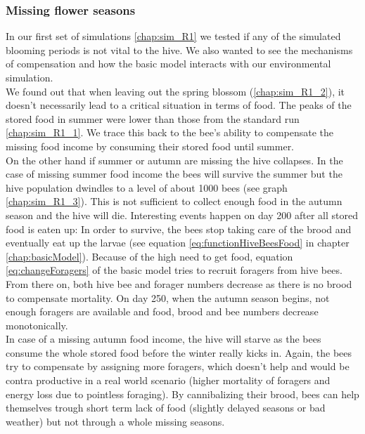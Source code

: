	\subsubsection{Missing flower seasons}
		\label{chap:missingFlowerSeasons}
		In our first set of simulations \ref{chap:sim_R1} we tested if any of the simulated blooming periods is not vital to the hive. We also wanted to see the mechanisms of compensation and how the basic model interacts with our environmental simulation.\\
		We found out that when leaving out the spring blossom (\ref{chap:sim_R1_2}), it doesn't necessarily lead to a critical situation in terms of food. The peaks of the stored food in summer were lower than those from the standard run \ref{chap:sim_R1_1}. We trace this back to the bee's ability to compensate the missing food income by consuming their stored food until summer.\\
		On the other hand if summer or autumn are missing the hive collapses. In the case of missing summer food income the bees will survive the summer but the hive population dwindles to a level of about 1000 bees (see graph \ref{chap:sim_R1_3}). This is not sufficient to collect enough food in the autumn season and the hive will die. Interesting events happen on day 200 after all stored food is eaten up: In order to survive, the bees stop taking care of the brood and eventually eat up the larvae (see equation \ref{eq:functionHiveBeesFood} in chapter \ref{chap:basicModel}). Because of the high need to get food, equation \ref{eq:changeForagers} of the basic model tries to recruit foragers from hive bees. From there on, both hive bee and forager numbers decrease as there is no brood to compensate mortality. On day 250, when the autumn season begins, not enough foragers are available and food, brood and bee numbers decrease monotonically.\\
		In case of a missing autumn food income, the hive will starve as the bees consume the whole stored food before the winter really kicks in. Again, the bees try to compensate by assigning more foragers, which doesn't help and would be contra productive in a real world scenario (higher mortality of foragers and energy loss due to pointless foraging).
		By cannibalizing their brood, bees can help themselves trough short term lack of food (slightly delayed seasons or bad weather) but not through a whole missing seasons.
		
